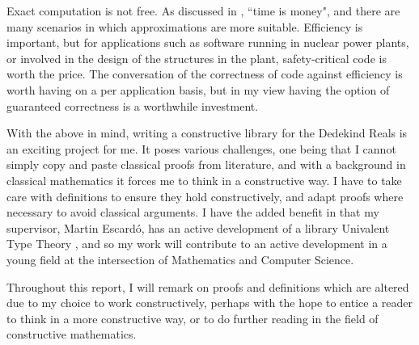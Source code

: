 \documentclass[ProjectReport]{subfiles}
\begin{document}
Exact computation is not free. As discussed in \cite{QualityInSimulation}, ``time is money", and there are many scenarios in which approximations are more suitable. Efficiency is important, but for applications such as software running in nuclear power plants, or involved in the design of the structures in the plant, safety-critical code is worth the price. The conversation of the correctness of code against efficiency is worth having on a per application basis, but in my view having the option of guaranteed correctness is a worthwhile investment.

With the above in mind, writing a constructive library for the Dedekind Reals is an exciting project for me. It poses various challenges, one being that I cannot simply copy and paste classical proofs from literature, and with a background in classical mathematics it forces me to think in a constructive way. I have to take care with definitions to ensure they hold constructively, and adapt proofs where necessary to avoid classical arguments. I have the added benefit in that my supervisor, Martin Escard\'o, has an active development of a library Univalent Type Theory \cite{TypeTopology}, and so my work will contribute to an active development in a young field at the intersection of Mathematics and Computer Science. 

Throughout this report, I will remark on proofs and definitions which are altered due to my choice to work constructively, perhaps with the hope to entice a reader to think in a more constructive way, or to do further reading in the field of constructive mathematics.
\end{document}
